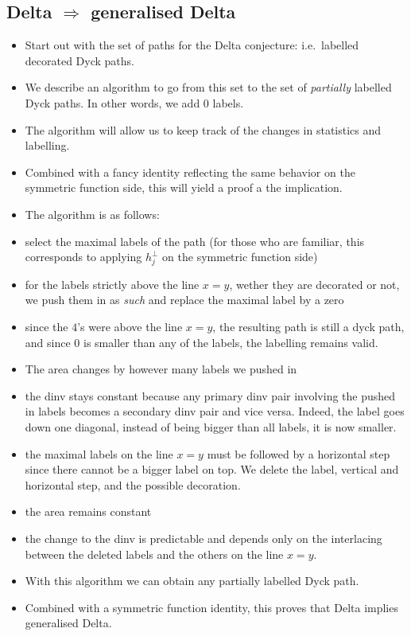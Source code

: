 \documentclass[12pt]{article}
\begin{document}
    \subsection{Delta $\Rightarrow$ generalised Delta}
        \begin{itemize}
            \item Start out with the set of paths for the Delta conjecture: i.e.\ labelled decorated Dyck paths. 
            \item We describe an algorithm to go from this set to the set of \emph{partially} labelled Dyck paths. In other words, we add $0$ labels.  
            \item The algorithm will allow us to keep track of the changes in statistics and labelling.
            \item Combined with a fancy identity reflecting the same behavior on the symmetric function side, this will yield a proof a the implication.
            \item The algorithm is as follows:
            \item select the maximal labels of the path (for those who are familiar, this corresponds to applying $h_j^\perp$ on the symmetric function side)
            \item for the labels strictly above the line $x=y$, wether they are decorated or not, we push them in as \emph{such} and replace the maximal label by a zero
            \item since the $4$'s were above the line $x=y$, the resulting path is still a dyck path, and since $0$ is smaller than any of the labels, the labelling remains valid. 
            \item The area changes by however many labels we pushed in
            \item the dinv stays constant because any primary dinv pair involving the pushed in labels becomes a secondary dinv pair and vice versa. Indeed, the label goes down one diagonal, instead of being bigger than all labels, it is now smaller.
            \item the maximal labels on the line $x=y$ must be followed by a horizontal step since there cannot be a bigger label on top. We delete the label, vertical and horizontal step, and the possible decoration. 
            \item the area remains constant
            \item the change to the dinv is predictable and depends only on the interlacing between the deleted labels and the others on the line $x=y$.  
            \item With this algorithm we can obtain any partially labelled Dyck path.
            \item Combined with a symmetric function identity, this proves that Delta implies generalised Delta. 
        \end{itemize}
\end{document}
